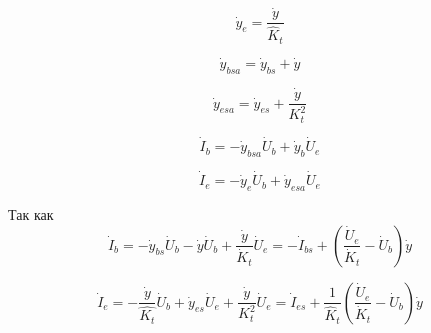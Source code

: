 \documentclass[]{article}
\begin{document}
\begin {equation}
\dot{y}_e = \frac{\dot{y}}{\hat{K}_t}
\end {equation}

\begin {equation}
\dot{y}_{bsa} = \dot{y}_{bs} + \dot{y}
\end {equation}

\begin {equation}
\dot{y}_{esa} = \dot{y}_{es} + \frac{\dot{y}}{K_t^2}
\end {equation}

\begin {equation}
\dot{I}_b = -\dot{y}_{bsa}\dot{U}_b + \dot{y}_b\dot{U}_e
\end {equation}

\begin {equation}
\dot{I}_e = -\dot{y}_e\dot{U}_b + \dot{y}_{esa}\dot{U}_e
\end {equation}

Так как
\begin {equation}
\dot{I}_b = -\dot{y}_{bs}\dot{U}_b - \dot{y}\dot{U}_b + \frac{\dot{y}}{\dot{K}_t}\dot{U}_e = 
-\dot{I}_{bs} + \left(\frac{\dot{U}_e}{\dot{K}_t}-\dot{U}_b\right)\dot{y}
\end {equation}

\begin {equation}
\dot{I}_e = -\frac{\dot{y}}{\hat{K_t}}\dot{U}_b + \dot{y}_{es}\dot{U}_e + \frac{\dot{y}}{K_t^2}\dot{U}_e = 
\dot{I}_{es} + \frac{1}{\hat{K}_t}\left(\frac{\dot{U}_e}{\dot{K}_t}-\dot{U}_b\right)\dot{y}
\end {equation}
\end{document}
